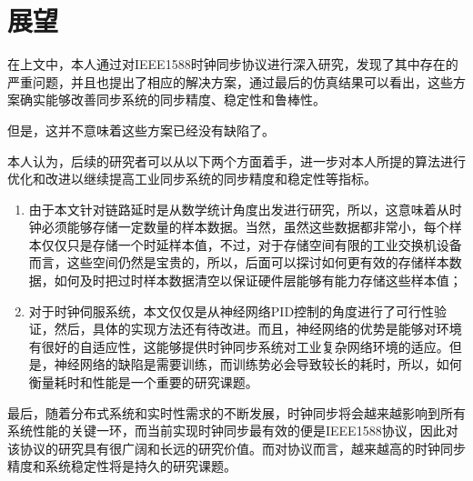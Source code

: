 \section{展望}
在上文中，本人通过对IEEE1588时钟同步协议进行深入研究，发现了其中存在的严重问题，并且也提出了相应的解决方案，通过最后的仿真结果可以看出，这些方案确实能够改善同步系统的同步精度、稳定性和鲁棒性。

但是，这并不意味着这些方案已经没有缺陷了。

本人认为，后续的研究者可以从以下两个方面着手，进一步对本人所提的算法进行优化和改进以继续提高工业同步系统的同步精度和稳定性等指标。
\begin{enumerate}[noitemsep,topsep=0pt,parsep=0pt,partopsep=0pt]
	\item 由于本文针对链路延时是从数学统计角度出发进行研究，所以，这意味着从时钟必须能够存储一定数量的样本数据。当然，虽然这些数据都非常小，每个样本仅仅只是存储一个时延样本值，不过，对于存储空间有限的工业交换机设备而言，这些空间仍然是宝贵的，所以，后面可以探讨如何更有效的存储样本数据，如何及时把过时样本数据清空以保证硬件层能够有能力存储这些样本值；
	\item 对于时钟伺服系统，本文仅仅是从神经网络PID控制的角度进行了可行性验证，然后，具体的实现方法还有待改进。而且，神经网络的优势是能够对环境有很好的自适应性，这能够提供时钟同步系统对工业复杂网络环境的适应。但是，神经网络的缺陷是需要训练，而训练势必会导致较长的耗时，所以，如何衡量耗时和性能是一个重要的研究课题。
\end{enumerate}

最后，随着分布式系统和实时性需求的不断发展，时钟同步将会越来越影响到所有系统性能的关键一环，而当前实现时钟同步最有效的便是IEEE1588协议，因此对该协议的研究具有很广阔和长远的研究价值。而对协议而言，越来越高的时钟同步精度和系统稳定性将是持久的研究课题。
